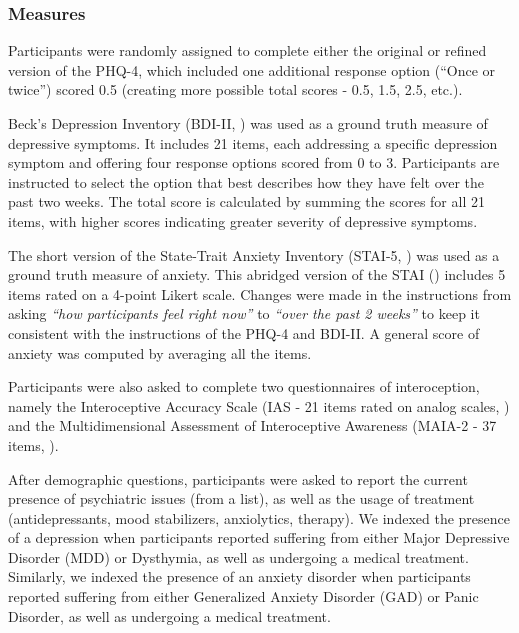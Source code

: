 \documentclass[
  man,
  floatsintext,
  longtable,
  nolmodern,
  notxfonts,
  notimes,
  colorlinks=true,linkcolor=blue,citecolor=blue,urlcolor=blue]{apa7}
\begin{document}
\subsubsection{Measures}\label{measures-1}

Participants were randomly assigned to complete either the original or
refined version of the PHQ-4, which included one additional response
option (``Once or twice'') scored 0.5 (creating more possible total
scores - 0.5, 1.5, 2.5, etc.).

Beck's Depression Inventory (BDI-II, ) was used as a ground truth measure of depressive symptoms.
It includes 21 items, each addressing a specific depression symptom and
offering four response options scored from 0 to 3. Participants are
instructed to select the option that best describes how they have felt
over the past two weeks. The total score is calculated by summing the
scores for all 21 items, with higher scores indicating greater severity
of depressive symptoms.

The short version of the State-Trait Anxiety Inventory (STAI-5,
) was used as a
ground truth measure of anxiety. This abridged version of the STAI
() includes 5
items rated on a 4-point Likert scale. Changes were made in the
instructions from asking \emph{``how participants feel right now''} to
\emph{``over the past 2 weeks''} to keep it consistent with the
instructions of the PHQ-4 and BDI-II. A general score of anxiety was
computed by averaging all the items.

Participants were also asked to complete two questionnaires of
interoception, namely the Interoceptive Accuracy Scale (IAS - 21 items
rated on analog scales, ) and the Multidimensional Assessment of Interoceptive Awareness
(MAIA-2 - 37 items, ).

After demographic questions, participants were asked to report the
current presence of psychiatric issues (from a list), as well as the
usage of treatment (antidepressants, mood stabilizers, anxiolytics,
therapy). We indexed the presence of a depression when participants
reported suffering from either Major Depressive Disorder (MDD) or
Dysthymia, as well as undergoing a medical treatment. Similarly, we
indexed the presence of an anxiety disorder when participants reported
suffering from either Generalized Anxiety Disorder (GAD) or Panic
Disorder, as well as undergoing a medical treatment.
\end{document}
